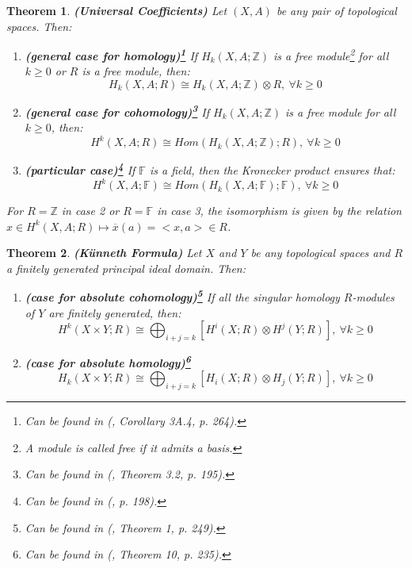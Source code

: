 \documentclass[12pt,oneside]{book}
\newtheorem{teo}    {Theorem}[chapter]
\newcommand{\ds}{\displaystyle}
\newcommand{\Z}{\mathbb{Z}}
\newcommand{\F}{\mathbb{F}}
\newcommand{\tensor}{\otimes}
\begin{document}
    \begin{teo}{\bf (Universal Coefficients)}
        Let $(X,A)$ be any pair of topological spaces. Then:
        \begin{enumerate}
            \item \textbf{(general case for homology)\footnote{Can be found in (\cite{hatcher}, 
            Corollary 3A.4, p. 264).}} If $H_{k}(X,A;\Z)$ is a free 
            module\footnote{A module is called free if it admits a basis.} for 
            all $k\geq 0$ or $R$ is a free module, then:
            $$ H_{k}(X,A;R)\cong H_{k}(X,A;\Z)\tensor R, \ \forall k\geq 0 $$
            \item \textbf{(general case for cohomology)\footnote{Can be found in (\cite{hatcher}, 
            Theorem 3.2, p. 195).}} If $H_{k}(X,A;\Z)$ is a free module for all $k\geq 0$, then:
            $$ H^{k}(X,A;R)\cong Hom(H_{k}(X,A;\Z);R), \ \forall k\geq 0 $$
            \item \textbf{(particular case)\footnote{Can be found in (\cite{hatcher}, p. 198).}} 
            If $\mathbb{F}$ is a field, then the Kronecker product ensures that:
            $$ H^{k}(X,A;\F)\cong Hom(H_{k}(X,A;\F);\F), \ \forall k\geq 0 $$
        \end{enumerate}
        For $R=\Z$ in case 2 or $R=\F$ in case 3, the isomorphism is given by the relation 
        $x\in H^{k}(X,A;R)\mapsto\overline{x}(a)=<x,a>\in R$.
    \end{teo}
    
    \begin{teo}{\bf (Künneth Formula)}
        Let $X$ and $Y$ be any topological spaces and $R$ a finitely generated principal ideal 
        domain. Then:
        \begin{enumerate}
            \item \textbf{(case for absolute cohomology)\footnote{Can be found in (\cite{spanier}, 
            Theorem 1, p. 249).}} If all the singular homology $R$-modules of $Y$ are finitely 
            generated, then:
            $$ H^{k}(X\times Y;R)\cong \ds\bigoplus_{i+j=k}\left[ H^{i}(X;R)\tensor H^{j}(Y;R)\right], \ 
            \forall k\geq 0 $$
            \item \textbf{(case for absolute homology)\footnote{Can be found in (\cite{spanier}, 
            Theorem 10, p. 235).}}
            $$ H_{k}(X\times Y;R)\cong \ds\bigoplus_{i+j=k}\left[ H_{i}(X;R)\tensor H_{j}(Y;R)\right], \ 
            \forall k\geq 0 $$
        \end{enumerate}
    \end{teo}
    
\end{document}
